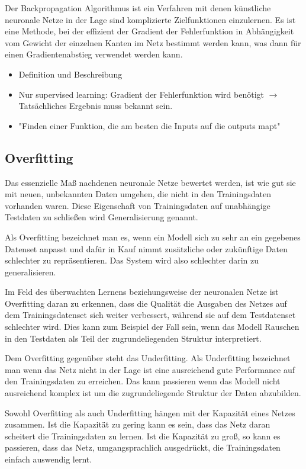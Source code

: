 Der Backpropagation Algorithmus ist ein Verfahren mit denen künstliche neuronale Netze in der Lage sind komplizierte Zielfunktionen einzulernen.
Es ist eine Methode, bei der effizient der Gradient der Fehlerfunktion in Abhängigkeit vom Gewicht der einzelnen Kanten im Netz bestimmt werden kann,
was dann für einen Gradientenabstieg verwendet werden kann. 

\begin{itemize}
	\item Definition und Beschreibung
	\item Nur supervised learning: Gradient der Fehlerfunktion wird benötigt \(\rightarrow\) Tatsächliches Ergebnis muss bekannt sein.
	\item "Finden einer Funktion, die am besten die Inputs auf die outputs mapt"
\end{itemize}

\subsection{Overfitting}

Das essenzielle Maß nachdenen neuronale Netze bewertet werden, ist wie gut sie mit neuen, unbekannten Daten umgehen, die nicht in den Trainingsdaten vorhanden waren. 
Diese Eigenschaft von Trainingsdaten auf unabhängige Testdaten zu schließen wird Generalisierung genannt. 

Als Overfitting bezeichnet man es, wenn ein Modell sich zu sehr an ein gegebenes Datenset anpasst und 
dafür in Kauf nimmt zusätzliche oder zukünftige Daten schlechter zu repräsentieren.
Das System wird also schlechter darin zu generalisieren.

Im Feld des überwachten Lernens beziehungsweise der neuronalen Netze ist Overfitting daran zu erkennen,
dass die Qualität die Ausgaben des Netzes auf dem Trainingsdatenset sich weiter verbessert,
während sie auf dem Testdatenset schlechter wird.
Dies kann zum Beispiel der Fall sein, wenn das Modell Rauschen in den Testdaten als Teil der zugrundeliegenden Struktur interpretiert. 


Dem Overfitting gegenüber steht das Underfitting. 
Als Underfitting bezeichnet man wenn das Netz nicht in der Lage ist
eine ausreichend gute Performance auf den Trainingsdaten zu erreichen.
Das kann passieren wenn das Modell nicht ausreichend komplex ist um die zugrundeliegende Struktur der Daten abzubilden.


Sowohl Overfitting als auch Underfitting hängen mit der Kapazität eines Netzes zusammen.
Ist die Kapazität zu gering kann es sein, dass das Netz daran scheitert die Trainingsdaten zu lernen.
Ist die Kapazität zu groß, so kann es passieren, dass das Netz, umgangsprachlich ausgedrückt, die Trainingsdaten einfach auswendig lernt.

